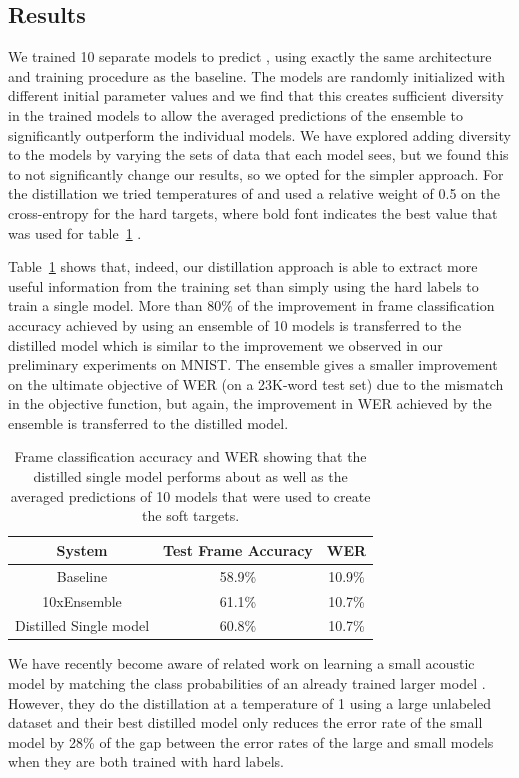\subsection{Results}

We trained 10 separate models to predict , using exactly the same architecture and training
procedure as the baseline. The models are randomly initialized with different initial parameter values and we find that
this creates sufficient diversity in the trained models to allow the averaged predictions of the ensemble to
significantly outperform the individual models.  We have explored adding diversity to the models by varying the sets of
data that each model sees, but we found this to not significantly change our results, so we opted for the simpler
approach. For the distillation we tried temperatures of \recordmath{[1, {\bf 2}, 5, 10]} and used a relative weight of 0.5 on the
cross-entropy for the hard targets, where bold font indicates the best value that was used for
table~\ref{tab:speech_results} .

Table~\ref{tab:speech_results} shows that, indeed, our distillation approach is able to extract more useful information
from the training set than simply using the hard labels to train a single model. More than 80\% of the improvement in
frame classification accuracy achieved by using an ensemble of 10 models is transferred to the distilled model which is
similar to the improvement we observed in our preliminary experiments on MNIST. The ensemble gives a smaller improvement
on the ultimate objective of WER (on a 23K-word test set) due to the mismatch in the objective function, but again, the
improvement in WER achieved by the ensemble is transferred to the distilled model.  

\begin{table}
\small
\centering
\begin{tabular}{|c|c|c|}
\hline
System & Test Frame Accuracy & WER \\
\hline
Baseline & 58.9\% & 10.9\%\\
10xEnsemble & 61.1\%& 10.7\% \\
Distilled Single model & 60.8\%& 10.7\%\\
\hline
\end{tabular}
\caption{Frame classification accuracy and WER showing that the distilled single model performs about as well as the
  averaged predictions of  10  models that were used to create the soft targets.}\label{tab:speech_results}
\end{table}

We have recently become aware of related work on learning a small acoustic model by matching the class probabilities of
an already trained larger model \cite{LiZhaoHuangGong}. However, they do the distillation at a temperature of 1 using a
large unlabeled dataset and their best distilled model only reduces the error rate of the small model by 28\% of the
gap between the error rates of the large and small models when they are both trained with hard labels.

